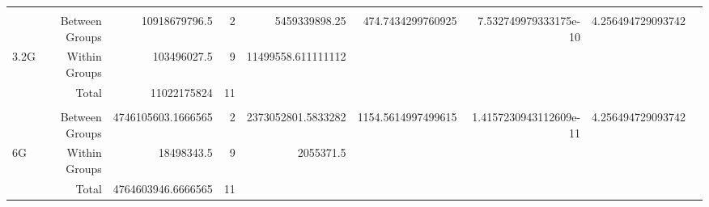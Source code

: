 \begin{landscape}
\begin{table}[!htp]
\begin{tabular}{lrrrrrrrr}
& & & & & & & \\
&Between Groups &10918679796.5 &2 &5459339898.25 &474.7434299760925 &7.532749979333175e-10 &4.256494729093742 \\
3.2G &Within Groups &103496027.5 &9 &11499558.611111112 & & & \\
&Total &11022175824 &11 & & & & \\
& & & & & & & \\
&Between Groups &4746105603.1666565 &2 &2373052801.5833282 &1154.5614997499615 &1.4157230943112609e-11 &4.256494729093742 \\
6G &Within Groups &18498343.5 &9 &2055371.5 & & & \\
&Total &4764603946.6666565 &11 & & & & \\
\bottomrule
\end{tabular}
\end{table}
\end{landscape}

